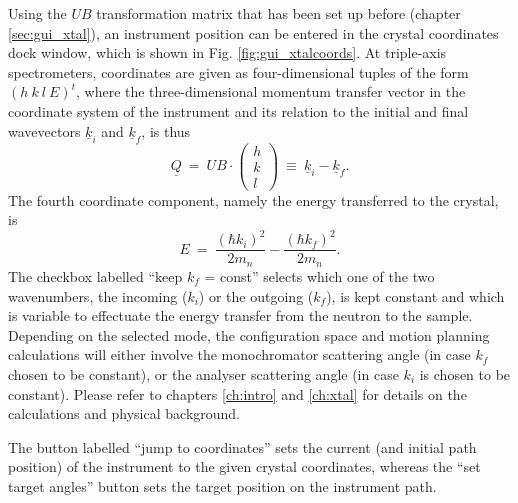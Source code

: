 \begin{minipage}{1 \textwidth}
Using the $UB$ transformation matrix that has been set up before (chapter \ref{sec:gui_xtal}),
an instrument position can be entered in the crystal coordinates dock window, which is
shown in Fig. \ref{fig:gui_xtalcoords}.
At triple-axis spectrometers, coordinates are given as four-dimensional tuples of the
form $\left(h\  k\  l\  E \right)^t$, where the three-dimensional momentum transfer
vector in the coordinate system of the instrument and its relation to the initial and final
wavevectors $\underline{k}_i$ and $\underline{k}_f$, is thus \cite[p. 11]{Shirane2002} \cite{Lumsden2005}
\begin{equation}
	\underline{Q}\ =\ UB\cdot \left(\begin{array}{c} h \\ k \\ l \end{array}\right) \ \equiv\ \underline{k}_i - \underline{k}_f.
\end{equation}
The fourth coordinate component, namely the energy transferred to the crystal, is \cite[p. 11]{Shirane2002}
\begin{equation}
	E \ =\ \frac{\left( \hbar k_i \right)^2}{2 m_n} - \frac{\left( \hbar k_f \right)^2}{2 m_n}.
\end{equation}
The checkbox labelled ``keep $k_f$ = const'' selects which one of the two wavenumbers, the incoming ($k_i$) 
or the outgoing ($k_f$), is kept constant and which is variable to effectuate the energy transfer
from the neutron to the sample.
Depending on the selected mode, the configuration space and motion planning calculations will either involve
the monochromator scattering angle (in case $k_f$ chosen to be constant), or the analyser scattering
angle (in case $k_i$ is chosen to be constant).
Please refer to chapters \ref{ch:intro} and \ref{ch:xtal} for details on the calculations and physical background.

The button labelled ``jump to coordinates'' sets the current (and initial path position)
of the instrument to the given crystal coordinates, whereas the ``set target angles'' button
sets the target position on the instrument path.

\end{minipage}



